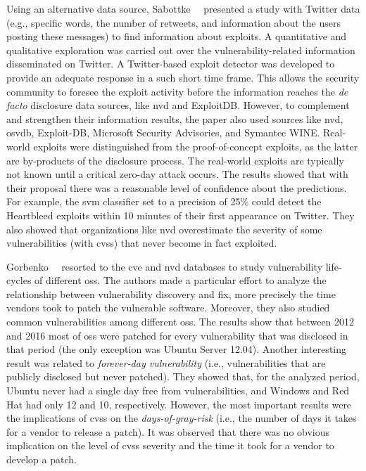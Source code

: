 Using an alternative data source, Sabottke~\etal{}~\cite{Sabottke:2015} presented a study with Twitter data (e.g., specific words, the number of retweets, and information about the users posting these messages) to find information about exploits. 
A quantitative and qualitative exploration was carried out over the vulnerability-related information disseminated on Twitter.
A Twitter-based exploit detector was developed to provide an adequate response in a such short time frame. 
This allows the security community to foresee the exploit activity before the information reaches the \emph{de facto} disclosure data sources, like \gls{nvd} and ExploitDB.
However, to complement and strengthen their information results, the paper also used sources like \gls{nvd}, \gls{osvdb}, Exploit-DB, Microsoft Security Advisories, and Symantec WINE. 
Real-world exploits were distinguished from the proof-of-concept exploits, as the latter are by-products of the disclosure process. 
The real-world exploits are typically not known until a critical zero-day attack occurs. 
The results showed that with their proposal there was a reasonable level of confidence about the predictions. 
For example, the \gls{svm} classifier set to a precision of 25\% could detect the Heartbleed exploits within 10 minutes of their first appearance on Twitter. 
They also showed that organizations like \gls{nvd} overestimate the severity of some vulnerabilities (with \gls{cvss}) that never become in fact exploited.


Gorbenko~\etal{}~\cite{Gorbenko:2017} resorted to the \gls{cve} and \gls{nvd} databases to study vulnerability life-cycles of different \glspl{os}.
The authors made a particular effort to analyze the relationship between vulnerability discovery and fix, more precisely the time vendors took to patch the vulnerable software.
Moreover, they also studied common vulnerabilities among different \glspl{os}.
The results show that between 2012 and 2016 most of \glspl{os} were patched for every vulnerability that was disclosed in that period (the only exception was Ubuntu Server 12.04).
Another interesting result was related to \emph{forever-day vulnerability} (i.e., vulnerabilities that are publicly disclosed but never patched). 
They showed that, for the analyzed period, Ubuntu never had a single day free from vulnerabilities, and Windows and Red Hat had only 12 and 10, respectively.
However, the most important results were the implications of \gls{cvss} on the \emph{days-of-gray-risk} (i.e., the number of days it takes for a vendor to release a patch). 
It was observed that there was no obvious implication on the level of \gls{cvss} severity and the time it took for a vendor to develop a patch.


